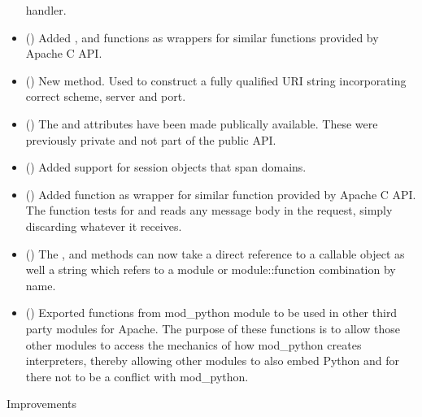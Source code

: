 \begin{itemize}
      handler.
    \item
      ()
      Added ,  and
       functions as wrappers for similar functions
      provided by Apache C API.
    \item
      ()
      New  method. Used to construct a fully
      qualified URI string incorporating correct scheme, server and port.
    \item
      ()
      The  and  attributes
      have been made publically available. These were previously private and
      not part of the public API.
    \item
      ()
      Added support for session objects that span domains.
    \item
      ()
      Added  function as wrapper for
      similar function provided by Apache C API. The function tests for
      and reads any message body in the request, simply discarding
      whatever it receives.
    \item
      ()
      The ,  and
       methods can now take a direct
      reference to a callable object as well a string which refers to a
      module or module::function combination by name.
    \item
      ()
      Exported functions from mod_python module to be used in other third
      party modules for Apache. The purpose of these functions is to allow
      those other modules to access the mechanics of how mod_python creates
      interpreters, thereby allowing other modules to also embed Python
      and for there not to be a conflict with mod_python.
  \end{itemize}

  Improvements
  

